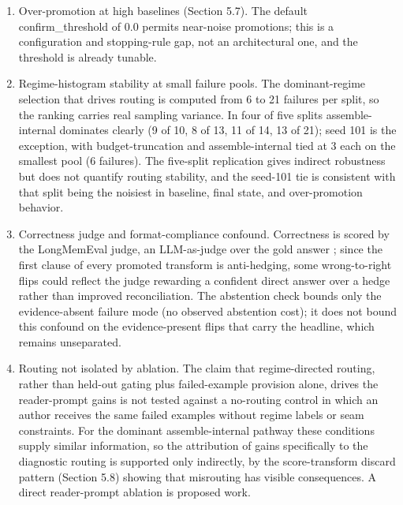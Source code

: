 \begin{enumerate}
\item Over-promotion at high baselines (Section 5.7). The default confirm\_threshold of 0.0 permits near-noise promotions; this is a configuration and stopping-rule gap, not an architectural one, and the threshold is already tunable.
\item Regime-histogram stability at small failure pools. The dominant-regime selection that drives routing is computed from 6 to 21 failures per split, so the ranking carries real sampling variance. In four of five splits assemble-internal dominates clearly (9 of 10, 8 of 13, 11 of 14, 13 of 21); seed 101 is the exception, with budget-truncation and assemble-internal tied at 3 each on the smallest pool (6 failures). The five-split replication gives indirect robustness but does not quantify routing stability, and the seed-101 tie is consistent with that split being the noisiest in baseline, final state, and over-promotion behavior.
\item Correctness judge and format-compliance confound. Correctness is scored by the LongMemEval judge, an LLM-as-judge over the gold answer \citep{wu2024longmemeval}; since the first clause of every promoted transform is anti-hedging, some wrong-to-right flips could reflect the judge rewarding a confident direct answer over a hedge rather than improved reconciliation. The abstention check bounds only the evidence-absent failure mode (no observed abstention cost); it does not bound this confound on the evidence-present flips that carry the headline, which remains unseparated.
\item Routing not isolated by ablation. The claim that regime-directed routing, rather than held-out gating plus failed-example provision alone, drives the reader-prompt gains is not tested against a no-routing control in which an author receives the same failed examples without regime labels or seam constraints. For the dominant assemble-internal pathway these conditions supply similar information, so the attribution of gains specifically to the diagnostic routing is supported only indirectly, by the score-transform discard pattern (Section 5.8) showing that misrouting has visible consequences. A direct reader-prompt ablation is proposed work.
\end{enumerate}

